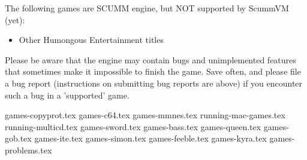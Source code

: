 \begin{itemize}
The following games are SCUMM engine, but NOT supported by ScummVM (yet):

  \begin{itemize}
  \item Other Humongous Entertainment titles
  \end{itemize}

Please be aware that the engine may contain bugs and unimplemented features
that sometimes make it impossible to finish the game. Save often, and please
file a bug report (instructions on submitting bug reports are above) if you
encounter such a bug in a 'supported' game.

\end{itemize}

 {games-copyprot.tex}
 {games-c64.tex}
 {games-mmnes.tex}
 {running-mac-games.tex}
 {running-multicd.tex}
 {games-sword.tex}
 {games-bass.tex}
 {games-queen.tex}
 {games-gob.tex}
 {games-ite.tex}
 {games-simon.tex}
 {games-feeble.tex}
 {games-kyra.tex}
 {games-problems.tex}
